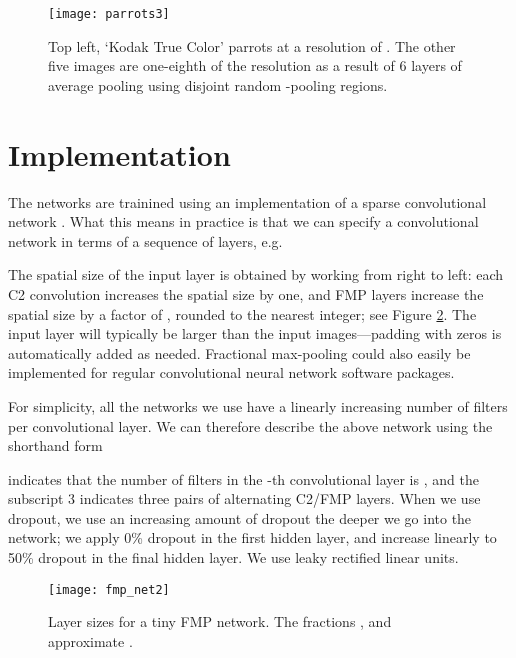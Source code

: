 \documentclass[english]{article}
\begin{document}
\begin{figure}
\begin{centering}
\texttt{[image: parrots3]}
\par\end{centering}

\caption{Top left, `Kodak True Color' parrots at a resolution of .
The other five images are one-eighth of the resolution as a result
of 6 layers of average pooling using disjoint random -pooling
regions. \label{fig:parrots}}
\end{figure}



\section{Implementation\label{sec:Implementation}}

The networks are trainined using an implementation of a  sparse convolutional network \cite{GrahamSparse}.
What this means in practice is
that we can specify a convolutional network in terms of a sequence
of layers, e.g.

The spatial size of the input layer is obtained by working from right
to left: each C2 convolution increases the spatial size by one, and
FMP layers increase the spatial size by a factor of ,
rounded to the nearest integer; see Figure \ref{fig:Layer-sizes-for}.
The input layer will typically be larger than the input images---padding
with zeros is automatically added as needed. Fractional max-pooling
could also easily be implemented for regular convolutional neural
network software packages.

For simplicity, all the networks we use have a linearly increasing
number of filters per convolutional layer. We can therefore describe
the above network using the shorthand form

 indicates that the number of filters in the -th convolutional
layer is , and the subscript 3 indicates three pairs of alternating
C2/FMP layers. When we use dropout, we use an increasing amount of
dropout the deeper we go into the network; we apply 0\% dropout in
the first hidden layer, and increase linearly to 50\% dropout in the
final hidden layer. We use leaky rectified linear units.

\begin{figure}
\begin{centering}
\texttt{[image: fmp\_net2]}
\par\end{centering}

\caption{Layer sizes for a tiny FMP network. The fractions ,
 and  approximate .\label{fig:Layer-sizes-for}}
\end{figure}
\end{document}
